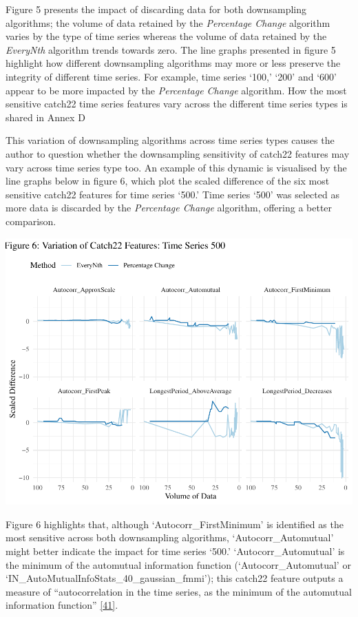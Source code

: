 \documentclass{article}
\begin{document}
Figure 5 presents the impact of discarding data for both downsampling
algorithms; the volume of data retained by the \emph{Percentage Change}
algorithm varies by the type of time series whereas the volume of data
retained by the \emph{EveryNth} algorithm trends towards zero. The line
graphs presented in figure 5 highlight how different downsampling
algorithms may more or less preserve the integrity of different time
series. For example, time series `100,' `200' and `600' appear to be
more impacted by the \emph{Percentage Change} algorithm. How the most
sensitive catch22 time series features vary across the different time
series types is shared in Annex D

This variation of downsampling algorithms across time series types
causes the author to question whether the downsampling sensitivity of
catch22 features may vary across time series type too. An example of
this dynamic is visualised by the line graphs below in figure 6, which
plot the scaled difference of the six most sensitive catch22 features
for time series `500.' Time series `500' was selected as more data is
discarded by the \emph{Percentage Change} algorithm, offering a better
comparison.

\includegraphics{210431461_CSC8639_Dissertation_files/figure-latex/Catch22Variation-1.pdf}

Figure 6 highlights that, although `Autocorr\_FirstMinimum' is
identified as the most sensitive across both downsampling algorithms,
`Autocorr\_Automutual' might better indicate the impact for time series
`500.' `Autocorr\_Automutual' is the minimum of the automutual
information function (`Autocorr\_Automutual' or
`IN\_AutoMutualInfoStats\_40\_gaussian\_fmmi'); this catch22 feature
outputs a measure of ``autocorrelation in the time series, as the
minimum of the automutual information function''
\protect\hyperlink{ref-feature_book}{{[}41{]}}.
\end{document}
